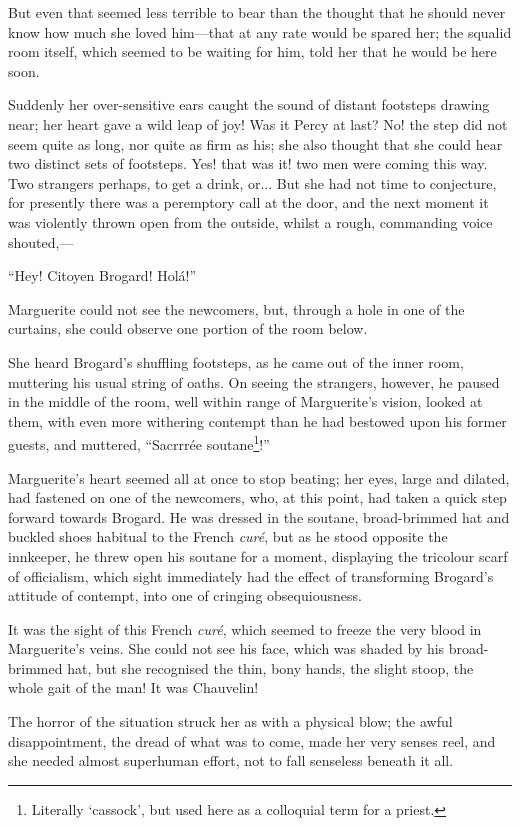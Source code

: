 \documentclass[paper=5.5in:8.5in,BCOR=7mm,twoside,DIV=calc,12pt,usegeometry,chapterprefix,endperiod,headings=big]{scrbook}
\begin{document}
But even that seemed less terrible to bear than the thought that he should never know how much she loved him---that at any rate would be spared her; the squalid room itself, which seemed to be waiting for him, told her that he would be here soon.

Suddenly her over-sensitive ears caught the sound of distant footsteps drawing near; her heart gave a wild leap of joy! Was it Percy at last? No! the step did not seem quite as long, nor quite as firm as his; she also thought that she could hear two distinct sets of footsteps. Yes! that was it! two men were coming this way. Two strangers perhaps, to get a drink, or... But she had not time to conjecture, for presently there was a peremptory call at the door, and the next moment it was violently thrown open from the outside, whilst a rough, commanding voice shouted,---

\enquote{Hey! Citoyen Brogard! Holá!}

Marguerite could not see the newcomers, but, through a hole in one of the curtains, she could observe one portion of the room below.

She heard Brogard's shuffling footsteps, as he came out of the inner room, muttering his usual string of oaths. On seeing the strangers, however, he paused in the middle of the room, well within range of Marguerite's vision, looked at them, with even more withering contempt than he had bestowed upon his former guests, and muttered, \enquote{Sacrrrée soutane\footnote{Literally \enquote{cassock}, but used here as a colloquial term for a priest.}!}

Marguerite's heart seemed all at once to stop beating; her eyes, large and dilated, had fastened on one of the newcomers, who, at this point, had taken a quick step forward towards Brogard. He was dressed in the soutane, broad-brimmed hat and buckled shoes habitual to the French \textit{curé}, but as he stood opposite the innkeeper, he threw open his soutane for a moment, displaying the tricolour scarf of officialism, which sight immediately had the effect of transforming Brogard's attitude of contempt, into one of cringing obsequiousness.

It was the sight of this French \textit{curé}, which seemed to freeze the very blood in Marguerite's veins. She could not see his face, which was shaded by his broad-brimmed hat, but she recognised the thin, bony hands, the slight stoop, the whole gait of the man! It was Chauvelin!

The horror of the situation struck her as with a physical blow; the awful disappointment, the dread of what was to come, made her very senses reel, and she needed almost superhuman effort, not to fall senseless beneath it all.
\end{document}
